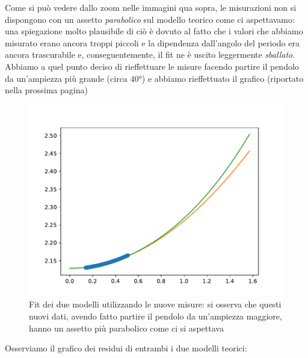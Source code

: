 \documentclass{article}
\begin{document}
\noindent Come si può vedere dallo zoom nelle immagini qua sopra, le misurazioni non si dispongono con un assetto \emph{parabolico} sul modello teorico come ci aspettavamo: una spiegazione molto plausibile di ciò è dovuto al fatto che i valori che abbiamo misurato erano ancora troppi piccoli e la dipendenza dall'angolo del periodo era ancora trascurabile e, conseguentemente, il fit ne è uscito leggermente \emph{sballato}. Abbiamo a quel punto deciso di rieffettuare le misure facendo partire il pendolo da un'ampiezza più grande (circa $\ang{40}$) e abbiamo rieffettuato il grafico (riportato nella prossima pagina)

\begin{figure}[H]
	\centering
	\includegraphics[scale=0.60]{Fit_ampiezza.pdf}
	\caption{Fit dei due modelli utilizzando le nuove misure: si osserva che questi nuovi dati, avendo fatto partire il pendolo da un'ampiezza maggiore, hanno un assetto più parabolico come ci si aspettava}
\end{figure}
Osserviamo il grafico dei residui di entrambi i due modelli teorici:
\end{document}
